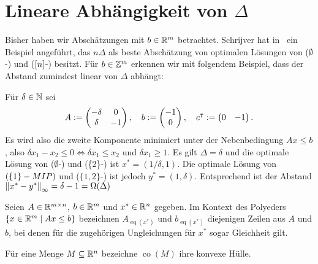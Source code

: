\newcommand{\one}{\mathbbm{1}}
\newcommand{\eq}[1]{{\operatorname{eq}(#1)}}
\newcommand{\co}[1]{\operatorname{co}(#1)}

\section{Lineare Abhängigkeit von $\Delta$}\label{sec:linear}

Bisher haben wir Abschätzungen mit $b\in\mathbb{R}^m$ betrachtet.
Schrijver hat in~\cite[Kapitel~17.2]{Schrijver1986} ein Beispiel angeführt, das $n\Delta$ als beste Abschätzung von optimalen Lösungen von ($\emptyset$-\MIPR) und ($[n]$-\MIPR) besitzt.
Für $b\in\mathbb{Z}^m$ erkennen wir mit folgendem Beispiel, dass der Abstand zumindest linear von $\Delta$ abhängt:
\begin{example}
	Für $\delta\in\mathbb{N}$ sei
	$$A:=
	\begin{pmatrix}
	-\delta & 0  \\
	\delta  & -1
	\end{pmatrix},\quad
	b:=\begin{pmatrix} -1 \\ 0 \end{pmatrix},\quad
	c^\intercal:=\begin{pmatrix}0 & -1\end{pmatrix}.
	$$
	Es wird also die zweite Komponente minimiert unter der Nebenbedingung $Ax\leq b$, also $\delta x_1-x_2\leq0\Leftrightarrow\delta x_1\leq x_2$ und $\delta x_1\geq 1$.
	Es gilt $\Delta=\delta$ und die optimale Lösung von ($\emptyset$-\MIPI) und (\{2\}-\MIPI) ist $x^*=(1/\delta,1)$.
	Die optimale Lösung von $(\{1\}-MIP)$ und ($\{1, 2\}$-\MIPI) ist jedoch $y^*=(1,\delta)$.
	Entsprechend ist der Abstand $\left\lVert x^*-y^*\right\rVert_\infty=\delta-1=\Omega(\Delta)$
\end{example}

\begin{notation}
	Seien $A\in\mathbb{R}^{m\times n}$, $b\in\mathbb{R}^m$ und $x^*\in\mathbb{R}^n$ gegeben.
	Im Kontext des Polyeders $\{ x\in\mathbb{R}^m \mid Ax\leq b \}$ bezeichnen
	$A_\eq{x^*}$ und $b_\eq{x^*}$ diejenigen Zeilen aus $A$ und $b$, bei denen für die zugehörigen Ungleichungen für $x^*$ sogar Gleichheit gilt.
	
	Für eine Menge $M\subseteq \mathbb{R}^n$ bezeichne $\co{M}$ ihre konvexe Hülle.
\end{notation}

